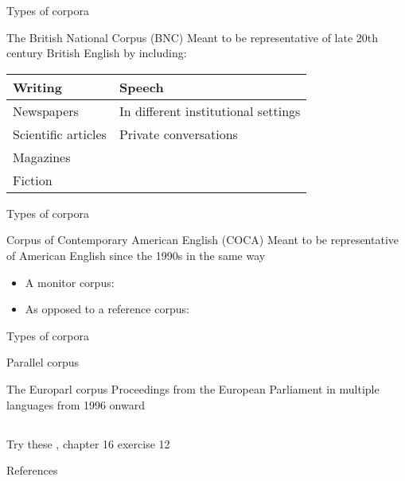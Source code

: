 \documentclass{beamer}
\newcommand{\subtwotwo}{Types of corpora}
\begin{document}
      \begin{frame}{\subtwotwo}
        \begin{block}{The British National Corpus (BNC) \parencite{bnc_consortium_british_2007}}
          Meant to be representative of late 20th century British English by including:
          \begin{tabular}{l l}
            \hline
            Writing             & Speech \\
            \hline
            Newspapers          & In different institutional settings \\
            Scientific articles & Private conversations \\
            Magazines           & \\
            Fiction             &
          \end{tabular}
        \end{block}
      \end{frame}

      \begin{frame}{\subtwotwo}
        \begin{block}{Corpus of Contemporary American English (COCA) \parencite{davies_corpus_2010}}
          Meant to be representative of American English since the 1990s in the same way
          \begin{itemize}
            \item A \alert{monitor corpus}: 
            \item As opposed to a \alert{reference corpus}: 
          \end{itemize}
        \end{block}
      \end{frame}

      \begin{frame}{\subtwotwo}
        \begin{alertblock}{Parallel corpus}
          
        \end{alertblock}
        \begin{block}{The Europarl corpus \parencite{koehn_europarl:_2009}}
          Proceedings from the European Parliament in multiple languages from 1996 onward
        \end{block}
      \end{frame}

    \subsection{}
      \begin{frame}{}
        \begin{block}{Try these}
          \textcite{dawson_language_2016}, chapter 16 exercise 12
        \end{block}
      \end{frame}

      \begin{frame}[allowframebreaks]{References}
        \printbibliography
      \end{frame}
\end{document}
